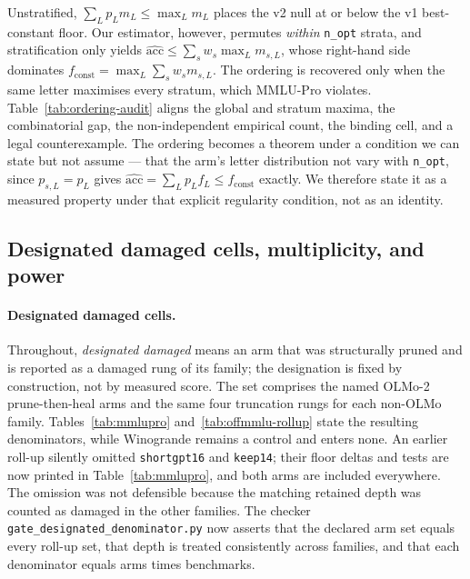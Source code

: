 Unstratified, $\sum_L p_{L}m_{L}\leq\max_Lm_{L}$ places the v2 null at or below the v1 best-constant floor. Our estimator, however, permutes \emph{within} \texttt{n\_opt} strata, and stratification only yields $\widehat{\mathrm{acc}}\leq\sum_s w_s\max_L m_{s,L}$, whose right-hand side dominates $f_{\mathrm{const}}=\max_L\sum_s w_s m_{s,L}$. The ordering is recovered only when the same letter maximises every stratum, which MMLU-Pro violates. Table~\ref{tab:ordering-audit} aligns the global and stratum maxima, the combinatorial gap, the non-independent empirical count, the binding cell, and a legal counterexample. The ordering becomes a theorem under a condition we can state but not assume --- that the arm's letter distribution not vary with \texttt{n\_opt}, since $p_{s,L}=p_{L}$ gives $\widehat{\mathrm{acc}}=\sum_L p_{L}f_{L}\leq f_{\mathrm{const}}$ exactly. We therefore state it as a measured property under that explicit regularity condition, not as an identity.



\FloatBarrier

\subsection{Designated damaged cells, multiplicity, and power}
\label{app:designated}

\paragraph{Designated damaged cells.} Throughout, \emph{designated damaged} means an arm that was structurally pruned and is reported as a damaged rung of its family; the designation is fixed by construction, not by measured score. The set comprises the named OLMo-2 prune-then-heal arms and the same four truncation rungs for each non-OLMo family. Tables~\ref{tab:mmlupro} and~\ref{tab:offmmlu-rollup} state the resulting denominators, while Winogrande remains a control and enters none. An earlier roll-up silently omitted \texttt{shortgpt16} and \texttt{keep14}; their floor deltas and tests are now printed in Table~\ref{tab:mmlupro}, and both arms are included everywhere. The omission was not defensible because the matching retained depth was counted as damaged in the other families. The checker \texttt{gate\_designated\_denominator.py} now asserts that the declared arm set equals every roll-up set, that depth is treated consistently across families, and that each denominator equals arms times benchmarks.

